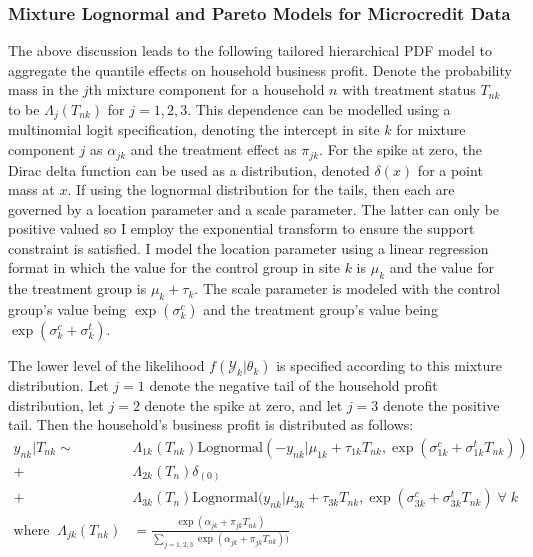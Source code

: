 \documentclass[english,12pt]{article}\usepackage{lmodern}
\numberwithin{equation}{section}
\begin{document}
\subsubsection{Mixture Lognormal and Pareto Models for Microcredit Data}
The above discussion leads to the following tailored hierarchical PDF model to aggregate the quantile effects on household business profit. Denote the probability mass in the $j$th mixture component for a household $n$ with treatment status $T_{nk}$ to be $\Lambda_j (T_{nk})$ for $j = 1,2,3$. This dependence can be modelled using a multinomial logit specification, denoting the intercept in site $k$ for mixture component $j$ as $\alpha_{jk}$ and the treatment effect as $\pi_{jk}$.  For the spike at zero, the Dirac delta function can be used as a distribution, denoted $\delta(x)$ for a point mass at $x$. If using the lognormal distribution for the tails, then each are governed by a location parameter and a scale parameter. The latter can only be positive valued so I employ the exponential transform to ensure the support constraint is satisfied. I model the location parameter using a linear regression format in which the value for the control group in site $k$ is $\mu_k$ and the value for the treatment group is $\mu_k + \tau_k$. The scale parameter is modeled with the control group's value being $\exp(\sigma^{c}_k)$ and the treatment group's value being $\exp(\sigma^{c}_k + \sigma^{t}_k)$.

The lower level of the likelihood $f(\mathcal{Y}_k | \theta_k)$ is specified according to this mixture distribution. Let $j=1$ denote the negative tail of the household profit distribution, let $j=2$ denote the spike at zero, and let $j=3$ denote the positive tail. Then the household's business profit is distributed as follows:
\begin{equation}
\begin{aligned}
y_{nk} | T_{nk}\sim \;&\Lambda_{1k}(T_{nk}) \text{Lognormal}(-y_{nk}| \mu_{1k} + \tau_{1k}T_{nk} ,  \exp(\sigma^{c}_{1k} + \sigma^{t}_{1k} T_{nk}))\\
+ &\Lambda_{2k}(T_n) \delta_{(0)} \\
+ &\Lambda_{3k}(T_n)   \text{Lognormal}(y_{nk}|\mu_{3k} + \tau_{3k}T_{nk} ,  \exp(\sigma^{c}_{3k} + \sigma^{t}_{3k} T_{nk}) \; \forall \; k \\
\text{where}\;\; \Lambda_{jk}(T_{nk}) &= \frac{\exp(\alpha_{jk} + \pi_ {jk} T_{nk})}{\sum_{j = 1,2,3}  \exp(\alpha_{jk} + \pi_{jk} T_{nk}))}
\end{aligned} \end{equation}
\end{document}
